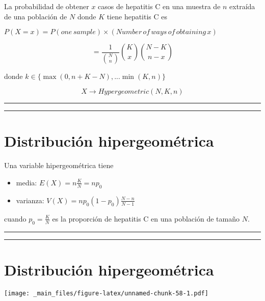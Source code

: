 \documentclass[
]{book}
\begin{document}
La probabilidad de obtener \(x\) casos de hepatitis C en una muestra de \(n\) extraída de una población de \(N\) donde \(K\) tiene hepatitis C es

\(P(X=x)=P(one\,sample) \times (Number\, of\, ways\, of\, obtaining\, x)\)

\[=\frac{1}{\binom N n}\binom K x \binom {N-K} {n-x}\]

donde \(k \in \{\max(0, n+K-N), ... \min(K, n) \}\)

\[X \rightarrow Hypergeometric(N,K,n)\]

\begin{center}\rule{0.5\linewidth}{0.5pt}\end{center}

\begin{center}\rule{0.5\linewidth}{0.5pt}\end{center}

\hypertarget{distribuciuxf3n-hipergeomuxe9trica-1}{%
\section{Distribución hipergeométrica}\label{distribuciuxf3n-hipergeomuxe9trica-1}}

Una variable hipergeométrica tiene

\begin{itemize}
\item
  media: \(E (X) = n \frac{K}{N} = np_0\)
\item
  varianza: \(V(X) = np_0(1-p_0)\frac{N-n}{N-1}\)
\end{itemize}

cuando \(p_0=\frac{K}{N}\) es la proporción de hepatitis C en una población de tamaño \(N\).

\begin{center}\rule{0.5\linewidth}{0.5pt}\end{center}

\begin{center}\rule{0.5\linewidth}{0.5pt}\end{center}

\hypertarget{distribuciuxf3n-hipergeomuxe9trica-2}{%
\section{Distribución hipergeométrica}\label{distribuciuxf3n-hipergeomuxe9trica-2}}

\texttt{[image: \_main\_files/figure-latex/unnamed-chunk-58-1.pdf]}
\end{document}
